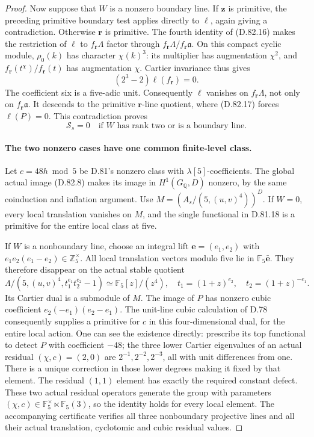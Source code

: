 \begin{proof}
Now suppose that \(W\) is a nonzero boundary line.
If \(\mathbf z\) is primitive, the preceding primitive
boundary test applies directly to \(\ell\), again giving
a contradiction. Otherwise \(\mathbf r\) is primitive.
The fourth identity of (D.82.16) makes the restriction of
\(\ell\) to \(f_{\mathbf r}\Lambda\) factor through
\(f_{\mathbf r}\Lambda/f_{\mathbf r}\mathfrak a\).
On this compact cyclic module, \(\rho_0(k)\) has character
\(\chi(k)^3\): its multiplier has augmentation \(\chi^2\),
and \(f_{\mathbf r}(t^\chi)/f_{\mathbf r}(t)\) has
augmentation \(\chi\). Cartier invariance thus gives
\[
                  (2^3-2)\ell(f_{\mathbf r})=0.
 \]
The coefficient six is a five-adic unit. Consequently
\(\ell\) vanishes on \(f_{\mathbf r}\Lambda\), not only
on \(f_{\mathbf r}\mathfrak a\). It descends to the
primitive \(\mathbf r\)-line quotient, where (D.82.17)
forces \(\ell(P)=0\). This contradiction proves
\[
           \mathcal S_s=0
       \quad\text{if \(W\) has rank two or is a boundary line.}
                                                               \tag{D.82.18}
\]

\paragraph{The two nonzero cases have one common finite-level class.}
Let \(c=48h\bmod5\) be D.81's nonzero class with
\(\lambda[5]\)-coefficients. The global actual image
(D.82.8) makes its image in \(H^1(G_{\mathbb Q},D)\)
nonzero, by the same coinduction and inflation argument.
Use \(M=(A_s/(5,(u,v)^4))^D\).
If \(W=0\), every local translation vanishes on \(M\),
and the single functional in D.81.18 is a primitive
for the entire local class at five.

If \(W\) is a nonboundary line, choose an integral lift
\(\mathbf e=(e_1,e_2)\) with
\(e_1e_2(e_1-e_2)\in\mathbb Z_5^\times\).
All local translation vectors modulo five lie in
\(\mathbb F_5\bar{\mathbf e}\).
They therefore disappear on the actual stable quotient
\[
 \Lambda/(5,(u,v)^4,t_1^{e_1}t_2^{e_2}-1)
       \simeq\mathbb F_5[z]/(z^4),\quad
             t_1=(1+z)^{e_2},\quad t_2=(1+z)^{-e_1}.
                                                               \tag{D.82.19}
\]
Its Cartier dual is a submodule of \(M\).
The image of \(P\) has nonzero cubic coefficient
\(e_2(-e_1)(e_2-e_1)\). The unit-line cubic calculation
of D.78 consequently supplies a primitive for \(c\)
in this four-dimensional dual, for the entire local action.
One can see the existence directly: prescribe its top
functional to detect \(P\) with coefficient \(-48\);
the three lower Cartier eigenvalues of an actual
residual \((\chi,c)=(2,0)\) are \(2^{-1},2^{-2},2^{-3}\),
all with unit differences from one. There is a unique
correction in those lower degrees making it fixed by
that element. The residual \((1,1)\) element has exactly
the required constant defect. These two actual residual
operators generate the group with parameters
\((\chi,c)\in\mathbb F_5^\times\ltimes\mathbb F_5(3)\),
so the identity holds for every local element.
The accompanying certificate verifies all three
nonboundary projective lines and all their actual
translation, cyclotomic and cubic residual values.


\end{proof}
